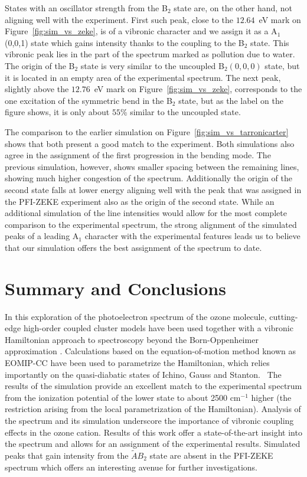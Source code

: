 \documentclass[
12pt,
a4paper,
prb,
superscriptaddress,
tightenlines,  %
]{revtex4}
\begin{document}
States with an oscillator strength from the B$_2$ state are, on the other
hand, not aligning well with the experiment. First such peak, close to the
$12.64$~eV mark on Figure~\ref{fig:sim_vs_zeke}, is of a vibronic
character and we assign it as a A$_1$(0,0,1) state which gains intensity
thanks to the coupling to the B$_2$ state. This vibronic peak lies in the part
of the spectrum marked as pollution due to water. The origin of the B$_2$
state is very similar to the uncoupled B$_2(0,0,0)$ state, but it is located
in an empty area of the experimental spectrum. The next peak, slightly above
the $12.76$~eV mark on Figure~\ref{fig:sim_vs_zeke}, corresponds to the one
excitation of the symmetric bend in the B$_2$ state, but as the label on the
figure shows, it is only about $55$\% similar to the uncoupled state.

The comparison to the earlier simulation on
Figure~\ref{fig:sim_vs_tarronicarter} shows that both present a good match to
the experiment. Both simulations also agree in the assignment of the first
progression in the bending mode. The previous simulation, however, shows
smaller spacing between the remaining lines, showing much higher congestion of
the spectrum. Additionally the origin of the second state falls at lower
energy aligning well with the peak that was assigned in the PFI-ZEKE
experiment also as the origin of the second state. While an additional
simulation of the line intensities would allow for the most complete
comparison to the experimental spectrum, the strong alignment of the simulated
peaks of a leading A$_1$ character with the experimental features leads us to
believe that our simulation offers the best assignment of the spectrum to
date.

\section{Summary and Conclusions} 

In this exploration of the photoelectron spectrum of the ozone molecule,
cutting-edge high-order coupled cluster models have been used together with a
vibronic Hamiltonian approach to spectroscopy beyond the Born-Oppenheimer
approximation \cite{Cederbaum:LVC:84, KDC:81, Koppel:CIbookCh7:04}.
Calculations based on the equation-of-motion method known as EOMIP-CC have
been used to parametrize the Hamiltonian, which relies importantly on the
quasi-diabatic states of Ichino, Gauss and Stanton.~\cite{Stanton:EOMIPdeg:09}
The results of the simulation provide an excellent match to the experimental
spectrum from the ionization potential of the lower state to about 2500
cm$^{-1}$ higher (the restriction arising from the local parametrization of
the Hamiltonian).  Analysis of the spectrum and its simulation underscore the
importance of vibronic coupling effects in the ozone cation.  Results of this
work offer a state-of-the-art insight into the spectrum and allows for an
assignment of the experimental results.  Simulated peaks that gain intensity
from the ${\tilde A}B_2$ state are absent in the PFI-ZEKE spectrum which
offers an interesting avenue for further investigations. 
\end{document}
